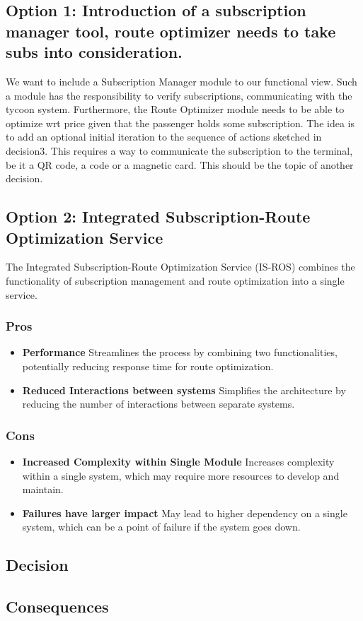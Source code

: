 \subsection*{Option 1: Introduction of a subscription manager tool, route optimizer needs to take subs into consideration.}
We want to include a Subscription Manager module to our functional view. 
Such a module has the responsibility to verify subscriptions, communicating with the tycoon system.
Furthermore, the Route Optimizer module needs to be able to optimize wrt price given that the passenger holds some subscription.
The idea is to add an optional initial iteration to the sequence of actions sketched in decision3.
This requires a way to communicate the subscription to the terminal, be it a QR code, a code or a magnetic card. 
This should be the topic of another decision.


\subsection*{Option 2: Integrated Subscription-Route Optimization Service}
The Integrated Subscription-Route Optimization Service (IS-ROS) combines the functionality of subscription management and route optimization into a single service. 
\subsubsection*{Pros}
\begin{itemize}[noitemsep]
    \item \textbf{Performance} Streamlines the process by combining two functionalities, potentially reducing response time for route optimization.
    \item \textbf{Reduced Interactions between systems} Simplifies the architecture by reducing the number of interactions between separate systems.
\end{itemize}
\subsubsection*{Cons}
\begin{itemize}[noitemsep]
    \item \textbf{Increased Complexity within Single Module} Increases complexity within a single system, which may require more resources to develop and maintain.
    \item \textbf{Failures have larger impact} May lead to higher dependency on a single system, which can be a point of failure if the system goes down.
\end{itemize}

\subsection*{Decision}
\subsection*{Consequences}
